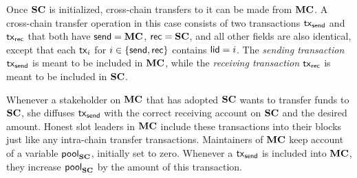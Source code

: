 Once $\mathbf{SC}$ is initialized, cross-chain transfers to it can be made from $\mathbf{MC}$.
A cross-chain transfer operation in this
case consists of two transactions $\mathsf{tx}_{\mathsf{send}}$ and $\mathsf{tx}_{\mathsf{rec}}$ that both have
$\mathsf{send}=\mathbf{MC}$, $\mathsf{rec}=\mathbf{SC}$, and all other fields are also identical, except that
each $\mathsf{tx}_i$ for $i\in\{\mathsf{send},\mathsf{rec}\}$ contains $\mathsf{lid}=i$.
The \emph{sending transaction} $\mathsf{tx}_{\mathsf{send}}$ is
meant to be included in $\mathbf{MC}$, while the \emph{receiving transaction} $\mathsf{tx}_{\mathsf{rec}}$ is meant to be included in
$\mathbf{SC}$.

    Whenever a stakeholder on $\mathbf{MC}$ that has adopted $\mathbf{SC}$  wants to transfer funds to $\mathbf{SC}$, she
    diffuses $\mathsf{tx}_{\mathsf{send}}$ with the correct receiving account on
    $\mathbf{SC}$ and the desired amount.
    Honest slot leaders in $\mathbf{MC}$
    include these transactions into their blocks just like any
    intra-chain transfer transactions.
    Maintainers of $\mathbf{MC}$ keep account of a variable $\mathsf{pool}_{\mathbf{SC}}$, initially set
    to zero. Whenever a $\mathsf{tx}_{\mathsf{send}}$ is included into $\mathbf{MC}$, they increase
    $\mathsf{pool}_{\mathbf{SC}}$ by the amount of this transaction.

